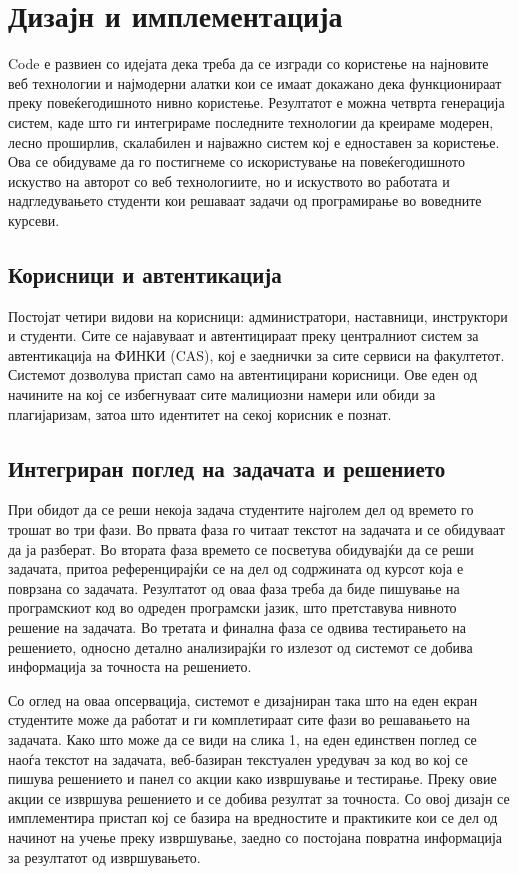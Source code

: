 \documentclass[a4paper,twocolumn]{article}
\begin{document}
\section{Дизајн и имплементација}

Code е развиен со идејата дека треба да се изгради со користење на најновите веб
технологии и најмодерни алатки кои се имаат докажано дека функционираат преку
повеќегодишното нивно користење. Резултатот е можна четврта генерација систем,
каде што ги интегрираме последните технологии да креираме модерен, лесно
проширлив, скалабилен и најважно систем кој е едноставен за користење. Ова се
обидуваме да го постигнеме со искористување на повеќегодишното искуство на
авторот со веб технологиите, но и искуството во работата и надгледувањето
студенти кои решаваат задачи од програмирање во воведните курсеви.

\subsection{Корисници и автентикација}

Постојат четири видови на корисници: администратори, наставници, инструктори и
студенти. Сите се најавуваат и автентицираат преку централниот систем за
автентикација на ФИНКИ (CAS), кој е заеднички за сите сервиси на факултетот.
Системот дозволува пристап само на автентицирани корисници. Ове еден од начините
на кој се избегнуваат сите малициозни намери или обиди за плагијаризам, затоа
што идентитет на секој корисник е познат.

\subsection{Интегриран поглед на задачата и решението}

При обидот да се реши некоја задача студентите најголем дел од времето го трошат
во три фази. Во првата фаза го читаат текстот на задачата и се обидуваат да ја
разберат. Во втората фаза времето се посветува обидувајќи да се реши задачата,
притоа референцирајќи се на дел од содржината од курсот која е поврзана со
задачата. Резултатот од оваа фаза треба да биде пишување на програмскиот код во
одреден програмски јазик, што претставува нивното решение на задачата. Во
третата и финална фаза се одвива тестирањето на решението, односно детално
анализирајќи го излезот од системот се добива информација за точноста на
решението.

Со оглед на оваа опсервација, системот е дизајниран така што на еден екран
студентите може да работат и ги комплетираат сите фази во решавањето на
задачата. Како што може да се види на слика 1, на еден единствен поглед се наоѓа
текстот на задачата, веб-базиран текстуален уредувач за код во кој се пишува
решението и панел со акции како извршување и тестирање. Преку овие акции се
извршува решението и се добива резултат за точноста. Со овој дизајн се
имплементира пристап кој се базира на вредностите и практиките кои се дел од
начинот на учење преку извршување, заедно со постојана повратна информација за
резултатот од извршувањето.
\end{document}
